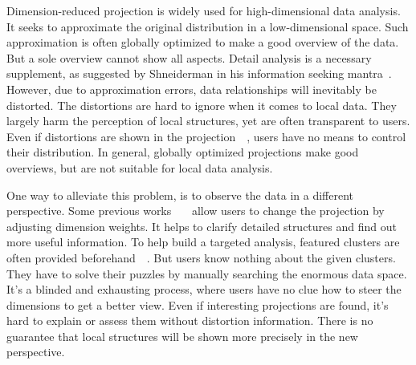 \maketitle
{}
Dimension-reduced projection is widely used for high-dimensional data analysis. It seeks to approximate the original distribution in a low-dimensional space. Such approximation is often globally optimized to make a good overview of the data. But a sole overview cannot show all aspects. Detail analysis is a necessary supplement, as suggested by Shneiderman in his information seeking mantra~\cite{DBLP:conf/vl/Shneiderman96}. However, due to approximation errors, data relationships will inevitably be distorted. The distortions are hard to ignore when it comes to local data. They largely harm the perception of local structures, yet are often transparent to users. Even if distortions are shown in the projection~\cite{DBLP:journals/tvcg/StahnkeDMT16}~\cite{DBLP:journals/ijon/Aupetit07}, users have no means to control their distribution. In general, globally optimized projections make good overviews, but are not suitable for local data analysis.

One way to alleviate this problem, is to observe the data in a different perspective. Some previous works~\cite{DBLP:journals/cgf/JeongZFRC09}~\cite{DBLP:journals/tvcg/NamM13}~\cite{DBLP:journals/tvcg/LehmannT13} allow users to change the projection by adjusting dimension weights. It helps to clarify detailed structures and find out more useful information. To help build a targeted analysis, featured clusters are often provided beforehand~\cite{DBLP:journals/tvcg/NamM13}~\cite{DBLP:journals/cgf/LiuWTBP15}. But users know nothing about the given clusters. They have to solve their puzzles by manually searching the enormous data space. It's a blinded and exhausting process, where users have no clue how to steer the dimensions to get a better view. Even if interesting projections are found, it's hard to explain or assess them without distortion information. There is no guarantee that local structures will be shown more precisely in the new perspective.

